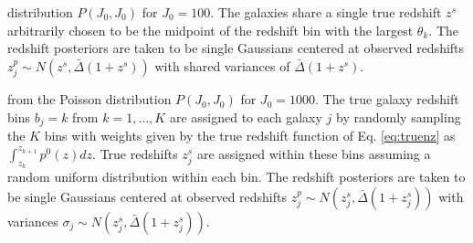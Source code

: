 \documentclass[preprint]{aastex}
\begin{document}


distribution $P(J_{0},J_{0})$ for $J_{0}=100$.  The galaxies share a single 
true redshift $z^{s}$ arbitrarily chosen to be the midpoint of the redshift bin 
with the largest $\theta_{k}$.  The redshift posteriors are taken to be single 
Gaussians centered at observed redshifts $z^{p}_{j}\sim 
N(z^{s},\bar{\Delta}(1+z^{s}))$ with shared variances of 
$\bar{\Delta}(1+z^{s})$. 


from the Poisson distribution $P(J_{0},J_{0})$ for $J_{0}=1000$.  The true 
galaxy redshift bins $b_{j}=k$ from $k=1,\dots,K$ are assigned to each galaxy 
$j$ by randomly sampling the $K$ bins with weights given by the true redshift 
function of Eq. \ref{eq:truenz} as $\int_{z_{k}}^{z_{k+1}}p^{0}(z)dz$. True 
redshifts $z^{s}_{j}$ are assigned within these bins assuming a random uniform 
distribution within each bin.  The redshift posteriors are taken to be single 
Gaussians centered at observed redshifts $z^{p}_{j}\sim 
N(z^{s}_{j},\bar{\Delta}(1+z^{s}_{j}))$ with variances $\sigma_{j}\sim 
N(z^{s}_{j},\bar{\Delta}(1+z^{s}_{j}))$. 



\end{document}
